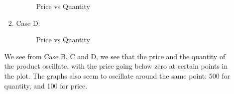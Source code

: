 \documentclass[12pt,letterpaper]{article}
\begin{document}
\begin{enumerate}
\begin{enumerate}
\begin{enumerate}
\begin{figure}[!htb]
              \caption{\label{fig:8} Price vs Quantity}
            \end{figure}
      \item Case D: 
            \begin{figure}[!htb]
              \caption{\label{fig:9} Price vs Quantity}
            \end{figure}
    \end{enumerate}
    We see from Case B, C and D, we see that the price and the quantity of the product
    oscillate, with the price going below zero at certain points in the plot. The graphs
    also seem to oscillate around the same point: 500 for quantity, and 100 for price. 
  \end{enumerate}
  

\end{enumerate}
\end{document}
